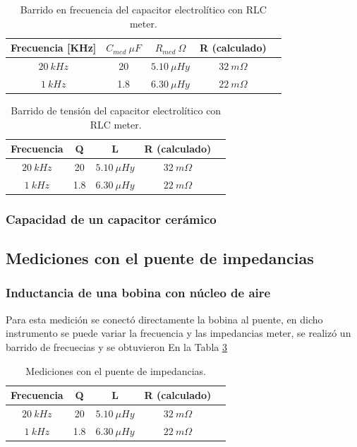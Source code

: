 \documentclass[a4paper,10pt]{article}
\begin{document}
		\begin{table}[!htp]
			\centering
			\begin{tabular}{|c|c|c|c|c|}
				\hline
				Frecuencia [KHz] & $C_{med}~\mu F$ & $R_{med}~\Omega$ & R (calculado) \\
				\hline
				$20~kHz$& 20 & $5.10~\mu Hy$ &$ 32~m\Omega$ \\
				\hline
				$1~kHz$& 1.8 & $6.30~\mu Hy$ &$ 22~m\Omega$ \\
				\hline	  
			\end{tabular}
			\caption{Barrido en frecuencia del capacitor electrolítico con RLC 
			meter.} 
			\label{tab002}
		\end{table}	

		\begin{table}[!htp]
			\centering
			\begin{tabular}{|c|c|c|c|c|}
				\hline
				Frecuencia & Q & L  & R (calculado) \\
				\hline
				$20~kHz$& 20 & $5.10~\mu Hy$ &$ 32~m\Omega$ \\
				\hline
				$1~kHz$& 1.8 & $6.30~\mu Hy$ &$ 22~m\Omega$ \\
				\hline	  
			\end{tabular}
			\caption{Barrido de tensión del capacitor electrolítico con RLC 
			meter.} 
			\label{tab003}
		\end{table}	


		\subsubsection{Capacidad de un capacitor cer\'amico}
	
	\subsection{Mediciones con el puente de impedancias}
		\subsubsection{Inductancia de una bobina con n\'ucleo de aire}
		\indent Para esta medición se conectó directamente la bobina al puente, 
		en dicho instrumento se puede variar la frecuencia y las impedancias
		meter, se realizó un barrido de frecuecias y se obtuvieron 
		En la Tabla \ref{tabPUENTEbobina}
		\begin{table}[!htp]
			\centering
			\begin{tabular}{|c|c|c|c|c|}
				\hline
				Frecuencia & Q & L  & R (calculado) \\
				\hline
				$20~kHz$& 20 & $5.10~\mu Hy$ &$ 32~m\Omega$ \\
				\hline
				$1~kHz$& 1.8 & $6.30~\mu Hy$ &$ 22~m\Omega$ \\
				\hline	  
			\end{tabular}
			\caption{Mediciones con el puente de impedancias.} 
			\label{tabPUENTEbobina}
		\end{table}	
		
\end{document}
